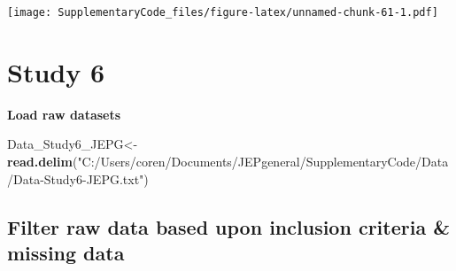 \documentclass[
]{book}
\newenvironment{Shaded}{\begin{snugshade}}{\end{snugshade}}
\newcommand{\KeywordTok}[1]{\textcolor[rgb]{0.13,0.29,0.53}{\textbf{#1}}}
\newcommand{\NormalTok}[1]{#1}
\newcommand{\StringTok}[1]{\textcolor[rgb]{0.31,0.60,0.02}{#1}}
\begin{document}
\texttt{[image: SupplementaryCode\_files/figure-latex/unnamed-chunk-61-1.pdf]}

\hypertarget{study-6}{%
\chapter{Study 6}\label{study-6}}

\textbf{Load raw datasets}

\begin{Shaded}
\begin{Highlighting}[]
\NormalTok{Data_Study6_JEPG<-}\KeywordTok{read.delim}\NormalTok{(}\StringTok{"C:/Users/coren/Documents/JEPgeneral/SupplementaryCode/Data/Data-Study6-JEPG.txt"}\NormalTok{)}
\end{Highlighting}
\end{Shaded}

\hypertarget{filter-raw-data-based-upon-inclusion-criteria-missing-data-3}{%
\section{Filter raw data based upon inclusion criteria \& missing data}\label{filter-raw-data-based-upon-inclusion-criteria-missing-data-3}}
\end{document}
